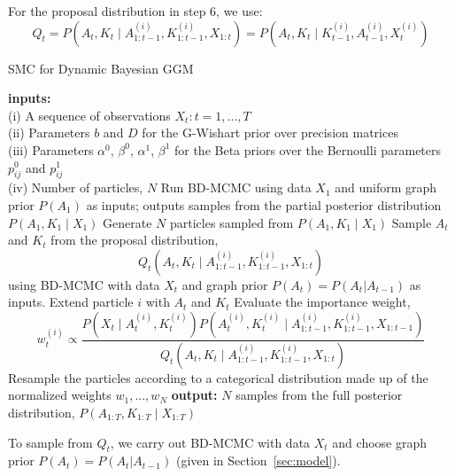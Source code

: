 \documentclass{article}
\begin{document}
For the proposal distribution in step 6, we use: 
$$Q_t = P(A_t, K_t \mid A_{1:t-1}^{(i)},K_{1:t-1}^{(i)},X_{1:t}) = P(A_t, K_t \mid K_{t-1}^{(i)}, A_{t-1}^{(i)}, X_{t}^{(i)})$$

\begin{algorithm}[h!tbp]
\caption{SMC for Dynamic Bayesian GGM}
\label{alg:smc}
\begin{algorithmic}[1]
\STATE \textbf{inputs:} \\(i) A sequence of observations $X_t : t = 1,...,T$ \\(ii) Parameters $b$ and $D$ for the G-Wishart prior over precision matrices \\(iii) Parameters $\alpha^0$, $\beta^0$, $\alpha^1$, $\beta^1$ for the Beta priors over the Bernoulli parameters $p_{ij}^0$ and $p_{ij}^1$ \\(iv) Number of particles, $N$
\STATE Run BD-MCMC using data $X_1$ and uniform graph prior $P(A_{1})$ as inputs; outputs samples from the partial posterior distribution $P(A_1,K_1 \mid X_1)$
\STATE Generate $N$ particles sampled from $P(A_1,K_1 \mid X_1)$
\STATE Sample $A_t$ and $K_t$ from the proposal distribution, $$Q_t(A_t,K_t \mid A_{1:t-1}^{(i)},K_{1:t-1}^{(i)},X_{1:t})$$ using BD-MCMC with data $X_{t}$ and graph prior $P(A_{t}) = P(A_{t}|A_{t-1})$ as inputs.
\STATE Extend particle $i$ with $A_t$ and $K_t$
\STATE Evaluate the importance weight, $$w_t^{(i)} \propto \frac{P(X_t \mid A_t^{(i)}, K_t^{(i)}) P(A_t^{(i)}, K_t^{(i)} \mid A_{1:t-1}^{(i)}, K_{1:t-1}^{(i)}, X_{1:t-1})}{Q_t(A_t,K_t \mid A_{1:t-1}^{(i)},K_{1:t-1}^{(i)},X_{1:t})}$$
\ENDFOR
\STATE Resample the particles according to a categorical distribution made up of the normalized weights $w_1,...,w_N$
\ENDFOR
\STATE \textbf{output:} $N$ samples from the full posterior distribution, $P(A_{1:T},K_{1:T} \mid X_{1:T})$
\end{algorithmic}
\label{alg:smc}
\end{algorithm}

To sample from $Q_t$, we carry out BD-MCMC with data $X_t$ and choose graph prior $P(A_{t}) = P(A_{t}|A_{t-1})$ (given in Section~\ref{sec:model}).
\end{document}

